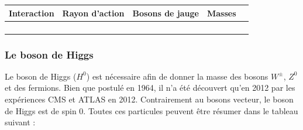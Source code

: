 \vspace{1cm}
\begin{table}[h!]
\centering
\begin{tabular}{|O|O|O|O|N}
\hline 
{}Interaction&Rayon d'action&Bosons de jauge&Masses\\
\hline 
{}&
& 
&
\\
\hline 
{}&
\shortstack{ $\infty$}& 
&
\\
\hline 
{}&
& 
&
\\
\hline 
{}&
\shortstack{$\infty$}& 
&
\\
\hline 
\end{tabular} 
\label{bosons}
\end{table}

\subsubsection{Le boson de Higgs}
Le boson de Higgs ($H^{0}$) est nécessaire afin de donner la masse des bosons $W^{\pm}$, $Z^{0}$ et des fermions. Bien que postulé en 1964, il n'a été découvert qu'en 2012 par les expériences CMS et ATLAS en 2012. Contrairement au bosons vecteur, le boson de Higgs est de spin 0.
\newpage
Toutes ces particules peuvent être résumer dans le tableau suivant : 

